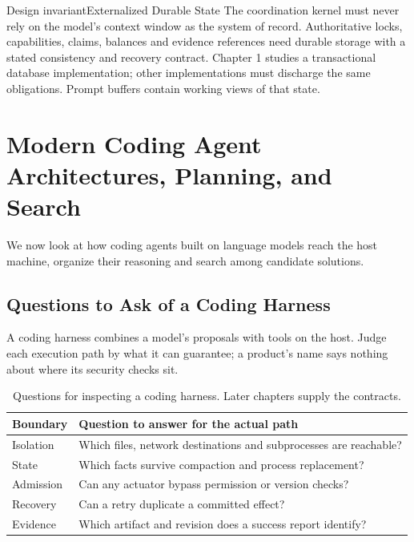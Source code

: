 \begin{pdclaim}{Design invariant}{Externalized Durable State}\label{req:external-state}
The coordination kernel must never rely on the model's context window as the system of record. Authoritative locks, capabilities, claims, balances and evidence references need durable storage with a stated consistency and recovery contract. Chapter 1 studies a transactional database implementation; other implementations must discharge the same obligations. Prompt buffers contain working views of that state.
\end{pdclaim}

\section{Modern Coding Agent Architectures, Planning, and Search}\label{sec:prereq-coding-agents}

We now look at how coding agents built on language models reach the host machine, organize their reasoning and search among candidate solutions.

\subsection{Questions to Ask of a Coding Harness}

A coding harness combines a model's proposals with tools on the host. Judge
each execution path by what it can guarantee; a product's name says nothing
about where its security checks sit.
\begin{table}[H]
\centering\small
\begin{tabularx}{\textwidth}{@{}lX@{}}
\toprule
\textbf{Boundary} & \textbf{Question to answer for the actual path}\\
\midrule
Isolation & Which files, network destinations and subprocesses are reachable?\\
State & Which facts survive compaction and process replacement?\\
Admission & Can any actuator bypass permission or version checks?\\
Recovery & Can a retry duplicate a committed effect?\\
Evidence & Which artifact and revision does a success report identify?\\
\bottomrule
\end{tabularx}
\caption{Questions for inspecting a coding harness. Later chapters supply the contracts.}
\label{tab:coding-agents}
\end{table}

